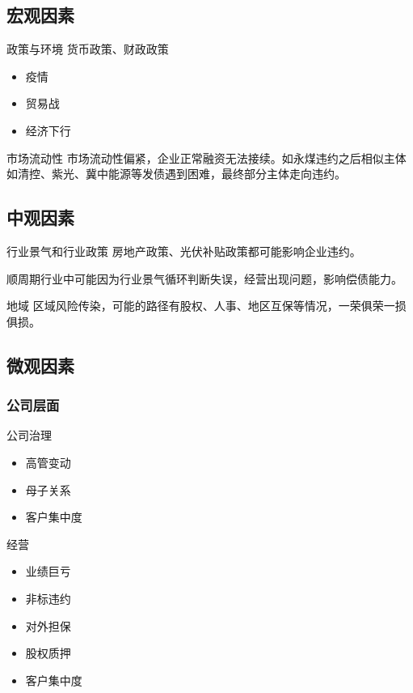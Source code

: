 \subsection{宏观因素}
\begin{frame}{政策与环境}
	货币政策、财政政策
	\begin{itemize}
		\item 疫情
		\item 贸易战
		\item 经济下行 \citet{bali2021macroeconomic}
	\end{itemize}
\end{frame}


\begin{frame}{市场流动性}
	市场流动性偏紧，企业正常融资无法接续。如永煤违约之后相似主体如清控、紫光、冀中能源等发债遇到困难，最终部分主体走向违约。
\end{frame}

\subsection{中观因素}
\begin{frame}{行业景气和行业政策}
	房地产政策、光伏补贴政策都可能影响企业违约。

	顺周期行业中可能因为行业景气循环判断失误，经营出现问题，影响偿债能力。
\end{frame}
\begin{frame}{地域}
	区域风险传染，可能的路径有股权、人事、地区互保等情况，一荣俱荣一损俱损。
\end{frame}
\subsection{微观因素}
\subsubsection{公司层面}
\begin{frame}{公司治理}
	\begin{itemize}
		\item 高管变动\cite{林晚发2018高管任职经历的得与失}
		\item 母子关系
		\item 客户集中度\cite{王雄元2017客户集中度与公司债二级市场信用利差}
	\end{itemize}
\end{frame}

\begin{frame}{经营}
	\begin{itemize}
		\item 业绩巨亏
		\item 非标违约
		\item 对外担保
		\item 股权质押
		\item 客户集中度 \citep{王雄元2017客户集中度与公司债二级市场信用利差}
	\end{itemize}
\end{frame}

